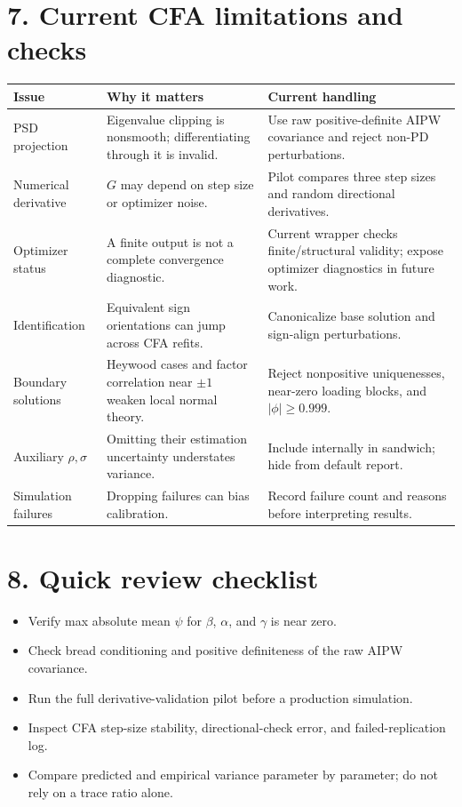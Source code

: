 \documentclass[10pt]{article}
\begin{document}
\section*{7. Current CFA limitations and checks}
\begin{tabularx}{\linewidth}{@{}l Y Y@{}}
\toprule
Issue & Why it matters & Current handling \\
\midrule
PSD projection & Eigenvalue clipping is nonsmooth; differentiating through it is invalid. & Use raw positive-definite AIPW covariance and reject non-PD perturbations. \\
Numerical derivative & $G$ may depend on step size or optimizer noise. & Pilot compares three step sizes and random directional derivatives. \\
Optimizer status & A finite output is not a complete convergence diagnostic. & Current wrapper checks finite/structural validity; expose optimizer diagnostics in future work. \\
Identification & Equivalent sign orientations can jump across CFA refits. & Canonicalize base solution and sign-align perturbations. \\
Boundary solutions & Heywood cases and factor correlation near $\pm1$ weaken local normal theory. & Reject nonpositive uniquenesses, near-zero loading blocks, and $|\phi|\ge0.999$. \\
Auxiliary $\rho,\sigma$ & Omitting their estimation uncertainty understates variance. & Include internally in sandwich; hide from default report. \\
Simulation failures & Dropping failures can bias calibration. & Record failure count and reasons before interpreting results. \\
\bottomrule
\end{tabularx}

\section*{8. Quick review checklist}
\begin{itemize}
\item Verify max absolute mean $\psi$ for $\beta$, $\alpha$, and $\gamma$ is near zero.
\item Check bread conditioning and positive definiteness of the raw AIPW covariance.
\item Run the full derivative-validation pilot before a production simulation.
\item Inspect CFA step-size stability, directional-check error, and failed-replication log.
\item Compare predicted and empirical variance parameter by parameter; do not rely on a trace ratio alone.
\end{itemize}
\end{document}

